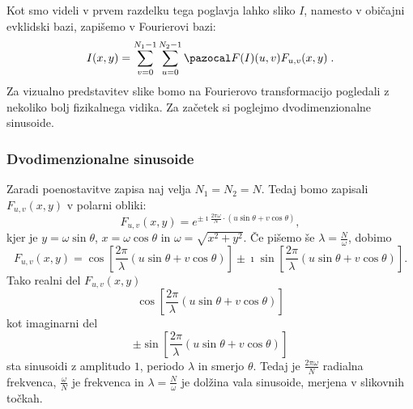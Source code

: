 Kot smo videli v prvem razdelku tega poglavja lahko sliko $I$, namesto v običajni evklidski bazi, zapišemo v Fourierovi bazi:
%
\begin{equation*}
I(x, y) = \sum_{v = 0}^{N_1 - 1} \sum_{u = 0}^{N_2 - 1} \F(I)(u, v) F_{u, v}(x, y)\;.
\end{equation*}
%
Za vizualno predstavitev slike bomo na Fourierovo transformacijo pogledali z nekoliko bolj fizikalnega vidika. Za začetek si poglejmo dvodimenzionalne sinusoide.
%
\subsubsection{Dvodimenzionalne sinusoide}
 Zaradi poenostavitve zapisa naj velja $N_1 = N_2 = N$. Tedaj bomo zapisali $F_{u,v}(x,y)$ v polarni obliki:
%
$$F_{u, v}(x, y) = e^{\pm \imath \frac{2\pi \omega}{N}\cdot (u \sin \theta + v \cos \theta)},$$
%
kjer je $y = \omega \sin \theta$, $x = \omega \cos \theta$ in $\omega = \sqrt{x^2 + y^2}$.
%
Če pišemo še $\lambda = \frac{N}{\omega}$, dobimo
$$F_{u, v}(x, y) = \cos[\frac{2\pi}{\lambda} (u \sin \theta + v \cos \theta)] \pm \imath \sin[\frac{2\pi}{\lambda}(u \sin \theta + v \cos \theta)].$$
%
Tako realni del $F_{u, v}(x, y)$
$$\cos[\frac{2\pi}{\lambda} (u \sin \theta + v \cos \theta)]$$
kot imaginarni del
$$\pm \sin\left[\frac{2\pi}{\lambda}(u \sin \theta + v \cos \theta)\right]$$
sta sinusoidi z amplitudo $1$, periodo $\lambda$ in smerjo $\theta$.
%
Tedaj je $\frac{2\pi \omega}{N}$ radialna frekvenca, $\frac{\omega}{N}$ je frekvenca in $\lambda = \frac{N}{\omega}$ je dolžina vala sinusoide, merjena v slikovnih točkah.

